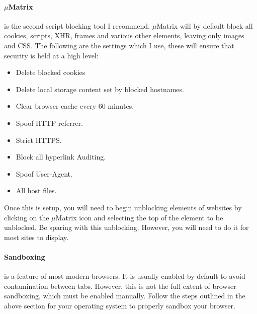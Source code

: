 \documentclass[a4paper,11pt]{article}
\begin{document}
		\paragraph{$\mu{}$Matrix}
			is the second script blocking tool I recommend. 
			$\mu{}$Matrix will by default block all cookies, scripts, XHR, frames and various other elements, leaving only images and CSS. 
			The following are the settings which I use, these will ensure that security is held at a high level:
			\begin{itemize}
				\item Delete blocked cookies
				\item Delete local storage content set by blocked hostnames. 
				\item Clear browser cache every 60 minutes. 
				\item Spoof HTTP referrer. 
				\item Strict HTTPS.
				\item Block all hyperlink Auditing. 
				\item Spoof User-Agent. 
				\item All host files. 
			\end{itemize}
			Once this is setup, you will need to begin unblocking elements of websites by clicking on the $\mu{}$Matrix icon and selecting the top of the element to be unblocked. 
			Be sparing with this unblocking. However, you will need to do it for most sites to display. 
		\paragraph{Sandboxing}
			is a feature of most modern browsers. It is usually enabled by default to avoid contamination between tabs. 
			However, this is not the full extent of browser sandboxing, which must be enabled manually. 
			Follow the steps outlined in the above section for your operating system to properly sandbox your browser. 
\end{document}
